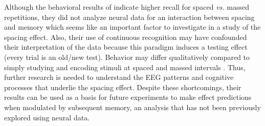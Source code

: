 Although the behavioral results of  indicate higher recall for spaced \textit{vs.} massed repetitions, they did not analyze neural data for an interaction between spacing and memory which seems like an important factor to investigate in a study of the spacing effect.  Also, their use of continuous recognition may have confounded their interpretation of the data because this paradigm induces a testing effect (every trial is an old/new test).  Behavior may differ qualitatively compared to simply studying and encoding stimuli at spaced and massed intervals \cite[p.~91]{DelaEtal2010}.
Thus, further research is needed to understand the EEG patterns and cognitive processes that underlie the spacing effect.  Despite these shortcomings, their results can be used as a basis for future experiments to make effect predictions when modulated by subsequent memory, an analysis that has not been previously explored using neural data.







